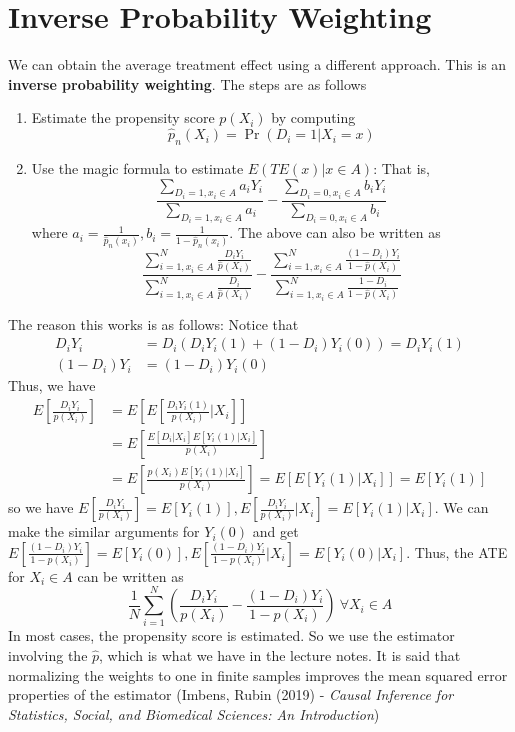 \section{Inverse Probability Weighting}
We can obtain the average treatment effect using a different approach. This is an \textbf{inverse probability weighting}. The steps are as follows
\begin{enumerate}
\item Estimate the propensity score $p(X_i)$ by computing
\[
\hat{p}_n(X_i)=\Pr(D_i=1|X_i=x)
\]
\item Use the magic formula to estimate $E(TE(x)|x\in A)$: That is,
\[
\frac{\sum_{D_i=1,x_i\in A}a_iY_i}{\sum_{D_i=1,x_i\in A}a_i}- \frac{\sum_{D_i=0,x_i\in A}b_iY_i}{\sum_{D_i=0,x_i\in A}b_i}
\]
where $a_i=\frac{1}{\hat{p}_n(x_i)}, b_i=\frac{1}{1-\hat{p}_n(x_i)}$. The above can also be written as
\[
\frac{\sum_{i=1,x_i\in A}^N\frac{D_iY_i}{\hat{p}(X_i)}}{\sum_{i=1,x_i\in A}^N\frac{D_i}{\hat{p}(X_i)}}-\frac{\sum_{i=1,x_i\in A}^N\frac{(1-D_i)Y_i}{1-\hat{p}(X_i)}}{\sum_{i=1,x_i\in A}^N\frac{1-D_i}{1-\hat{p}(X_i)}}\]
\end{enumerate}\par
The reason this works is as follows: Notice that
\begin{align*}
D_iY_i& = D_i(D_iY_i(1)+(1-D_i)Y_i(0))=D_iY_i(1)\\
(1-D_i)Y_i&=(1-D_i)Y_i(0)
\end{align*}
Thus, we have
\begin{align*}
E\left[\frac{D_iY_i}{p(X_i)}\right]&=E\left[E\left[\frac{D_iY_i(1)}{p(X_i)}|X_i\right]\right]\\
&=E\left[\frac{E[D_i|X_i]E[Y_i(1)|X_i]}{p(X_i)}\right]\\
&=E\left[\frac{p(X_i)E[Y_i(1)|X_i]}{p(X_i)}\right]=E[E[Y_i(1)|X_i]]=E[Y_i(1)]
\end{align*}
so we have $E\left[\frac{D_iY_i}{p(X_i)}\right]=E[Y_i(1)], E\left[\frac{D_iY_i}{p(X_i)}|X_i\right]=E[Y_i(1)|X_i]$. We can make the similar arguments for $Y_i(0)$ and get $E\left[\frac{(1-D_i)Y_i}{1-p(X_i)}\right]=E[Y_i(0)], E\left[\frac{(1-D_i)Y_i}{1-p(X_i)}|X_i\right]=E[Y_i(0)|X_i]$. Thus, the ATE for $X_i\in A$ can be written as
\[
\frac{1}{N}\sum_{i=1}^N\left(\frac{D_i Y_i}{p(X_i)}-\frac{(1-D_i)Y_i}{1-p(X_i)}\right) \ \forall X_i\in A
\]
In most cases, the propensity score is estimated. So we use the estimator involving the $\hat{p}$, which is what we have in the lecture notes. It is said that normalizing the weights to one in finite samples improves the mean squared error properties of the estimator (Imbens, Rubin (2019) - \textit{Causal Inference for Statistics, Social, and Biomedical Sciences: An Introduction})
